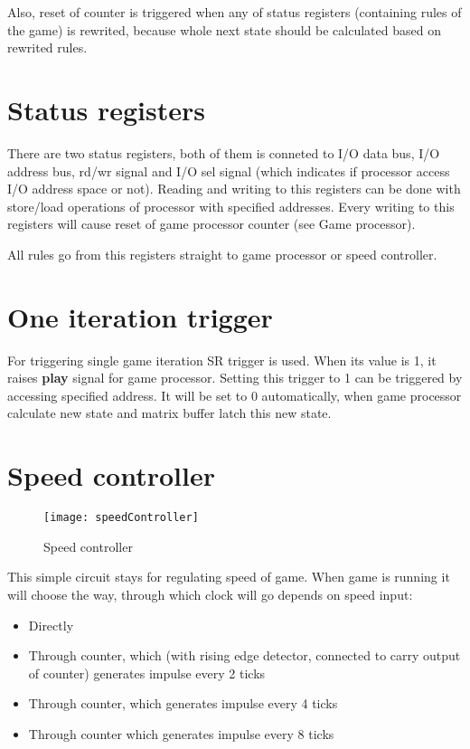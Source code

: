 Also, reset of counter is triggered when any of status registers (containing rules of the game) is rewrited, because whole next state should be calculated based on rewrited rules.

\section*{Status registers}

There are two status registers, both of them is conneted to I/O data bus, I/O address bus, rd/wr signal and I/O sel signal (which indicates if processor access I/O address space or not). Reading and writing to this registers can be done with store/load operations of processor with specified addresses. Every writing to this registers will cause reset of game processor counter (see Game processor).

All rules go from this registers straight to game processor or speed controller.

\section*{One iteration trigger}

For triggering single game iteration SR trigger is used. When its value is 1, it raises \textbf{play} signal for game processor. Setting this trigger to 1 can be triggered by accessing specified address. It will be set to 0 automatically, when game processor calculate new state and matrix buffer latch this new state.

\section*{Speed controller}

\begin{figure}[ht]
	\centering
	\texttt{[image: speedController]}
	\caption{Speed controller}
\end{figure}

This simple circuit stays for regulating speed of game. When game is running it will choose the way, through which clock will go depends on speed input:

\begin{itemize}
	\item Directly 
	\item Through counter, which (with rising edge detector, connected to carry output of counter) generates impulse every 2 ticks
	\item Through counter, which generates impulse every 4 ticks
	\item Through counter which generates impulse every 8 ticks
\end{itemize}

